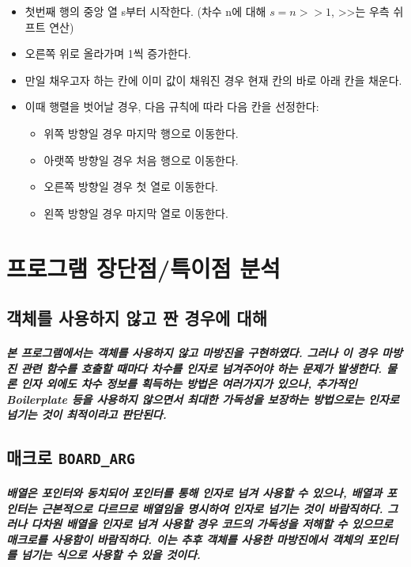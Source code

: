 \documentclass[UTF8]{report}
\begin{document}
            \begin{itemize}
                \item 첫번째 행의 중앙 열 s부터 시작한다. (차수 n에 대해 $s = n >> 1$, >>는 우측 쉬프트 연산)
                \item 오른쪽 위로 올라가며 1씩 증가한다.
                \item 만일 채우고자 하는 칸에 이미 값이 채워진 경우 현재 칸의 바로 아래 칸을 채운다.
                \item 이때 행렬을 벗어날 경우, 다음 규칙에 따라 다음 칸을 선정한다:\\
                      \begin{itemize}
                          \item 위쪽 방향일 경우 마지막 행으로 이동한다.
                          \item 아랫쪽 방향일 경우 처음 행으로 이동한다.
                          \item 오른쪽 방향일 경우 첫 열로 이동한다.
                          \item 왼쪽 방향일 경우 마지막 열로 이동한다.
                      \end{itemize}
            \end{itemize}
                
    \chapter{프로그램 장단점/특이점 분석}
        \section{객체를 사용하지 않고 짠 경우에 대해}
            \paragraph{%
                \normalfont 본 프로그램에서는 객체를 사용하지 않고 마방진을 구현하였다. 그러나 이 경우 마방진 관련 함수를 호출할 때마다 차수를 인자로 넘겨주어야 하는 문제가 발생한다. 물론 인자 외에도 차수 정보를 획득하는 방법은 여러가지가 있으나, 추가적인 Boilerplate 등을 사용하지 않으면서 최대한 가독성을 보장하는 방법으로는 인자로 넘기는 것이 최적이라고 판단된다.
            }

        \section{매크로 \texttt{BOARD\_ARG}}
            \paragraph{%
                \normalfont 배열은 포인터와 동치되어 포인터를 통해 인자로 넘겨 사용할 수 있으나, 배열과 포인터는 근본적으로 다르므로 배열임을 명시하여 인자로 넘기는 것이 바람직하다. 그러나 다차원 배열을 인자로 넘겨 사용할 경우 코드의 가독성을 저해할 수 있으므로 매크로를 사용함이 바람직하다. 이는 추후 객체를 사용한 마방진에서 객체의 포인터를 넘기는 식으로 사용할 수 있을 것이다.
            }
\end{document}
